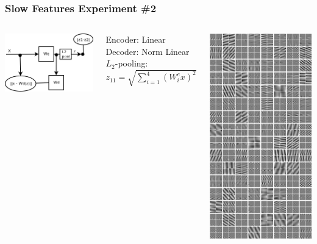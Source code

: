 \documentclass{beamer}
\begin{document}
\begin{frame}
\frametitle{Slow Features Experiment \#2}    
\begin{columns}[c]
    \column{4cm}
            \includegraphics[scale=0.3]{./figures/sfa3.png} 
            \vspace{0.1cm}
             \begin{tiny}
			 Encoder: Linear \\
			 Decoder: Norm Linear \\
			 $L_2$-pooling: $z_{11} = \sqrt{\sum_{i=1} ^4 (W^e_i x)^2}$
			\end{tiny}
    \column{4cm}
             \includegraphics[scale=0.3]{./figures/fourier.png} 
\end{columns} 
\end{frame} 
\end{document}
